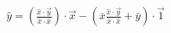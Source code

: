 \documentclass[preview]{standalone}
\begin{document}
\begin{align*}
\hat{y} =  ( \frac{\hat{x}\cdot\overrightarrow{y}}{\hat{x}\cdot\hat{x}} ) \cdot \overrightarrow{x} -( \bar{x} \frac{\hat{x}\cdot\overrightarrow{y}}{\hat{x}\cdot\hat{x}} + \bar{y} ) \cdot \overrightarrow{1}
\end{align*}
\end{document}
